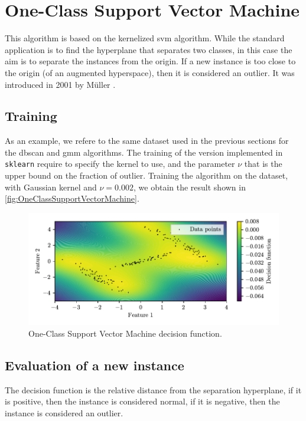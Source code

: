\section{One-Class Support Vector Machine}
\label{sec:OneClassSupportVectorMachine}

This algorithm is based on the kernelized \gls{svm} algorithm. While the standard application is to find the hyperplane that separates two classes, in this case the aim is to separate the instances from the origin. If a new instance is too close to the origin (of an augmented hyperspace), then it is considered an outlier. It was introduced in 2001 by M\"{u}ller \cite{mullerOneClassSVM}.

\subsection{Training}
As an example, we refere to the same dataset used in the previous sections for the \gls{dbscan} and {\gls{gmm}} algorithms. The training of the version implemented in \texttt{sklearn} require to specify the kernel to use, and the parameter $\nu$ that is the upper bound on the fraction of outlier. Training the algorithm on the dataset, with Gaussian kernel and $\nu=0.002$, we obtain the result shown in \autoref{fig:OneClassSupportVectorMachine}. 

\begin{figure}
    \centering
    \includegraphics{images/nuSVM/Figure_1.pdf}
    \caption{One-Class Support Vector Machine decision function.}
    \label{fig:OneClassSupportVectorMachine}
\end{figure}

\subsection{Evaluation of a new instance}
\label{sec:svm_eval}
The decision function is the relative distance from the separation hyperplane, if it is positive, then the instance is considered normal, if it is negative, then the instance is considered an outlier. 

